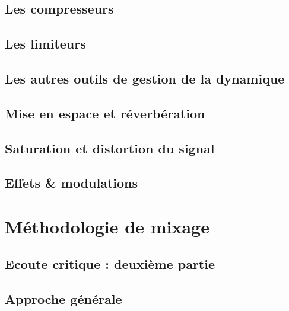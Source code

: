 \documentclass[
  letterpaper,
  DIV=11,
  numbers=noendperiod]{scrreprt}
\begin{document}
\hypertarget{les-compresseurs}{%
\chapter{Les compresseurs}\label{les-compresseurs}}

\hypertarget{les-limiteurs}{%
\chapter{Les limiteurs}\label{les-limiteurs}}

\hypertarget{les-autres-outils-de-gestion-de-la-dynamique}{%
\chapter{Les autres outils de gestion de la
dynamique}\label{les-autres-outils-de-gestion-de-la-dynamique}}

\hypertarget{mise-en-espace-et-ruxe9verbuxe9ration}{%
\chapter{Mise en espace et
réverbération}\label{mise-en-espace-et-ruxe9verbuxe9ration}}

\hypertarget{saturation-et-distortion-du-signal}{%
\chapter{Saturation et distortion du
signal}\label{saturation-et-distortion-du-signal}}

\hypertarget{effets-modulations}{%
\chapter{Effets \& modulations}\label{effets-modulations}}

\part{Méthodologie de mixage}

\hypertarget{ecoute-critique-deuxiuxe8me-partie}{%
\chapter{Ecoute critique : deuxième
partie}\label{ecoute-critique-deuxiuxe8me-partie}}

\hypertarget{approche-guxe9nuxe9rale}{%
\chapter{Approche générale}\label{approche-guxe9nuxe9rale}}
\end{document}
